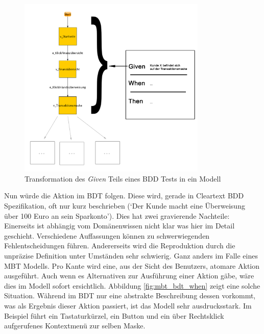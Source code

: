 \begin{figure} 
  \centering
     \includegraphics[width=0.8\textwidth]{figures/mbt_bdt_given.png}
  \caption{Transformation des \textit{Given} Teils eines BDD Tests in ein Modell}
  \label{fig:mbt_bdt_given}
\end{figure}

Nun würde die Aktion im \Gls{BDT} folgen. Diese wird, gerade in Cleartext \Gls{BDD} Spezifikation, oft nur kurz beschrieben (`Der Kunde macht eine Überweisung über 100 Euro an sein Sparkonto'). Dies hat zwei gravierende Nachteile: Einerseits ist abhängig vom Domänenwissen nicht klar was hier im Detail geschieht. Verschiedene Auffassungen können zu schwerwiegenden Fehlentscheidungen führen. Andererseits wird die Reproduktion durch die unpräzise Definition unter Umständen sehr schwierig. Ganz anders im Falle eines \Gls{MBT} Modells. Pro Kante wird eine, aus der Sicht des Benutzers, atomare Aktion ausgeführt. Auch wenn es Alternativen zur Ausführung einer Aktion gäbe, wäre dies im Modell sofort ersichtlich. Abbildung \ref{fig:mbt_bdt_when} zeigt eine solche Situation. Während im \Gls{BDT} nur eine abstrakte Beschreibung dessen vorkommt, was als Ergebnis dieser Aktion passiert, ist das Modell sehr ausdrucksstark. Im Beispiel führt ein Tastaturkürzel, ein Button und ein über Rechtsklick aufgerufenes Kontextmenü zur selben Maske.

